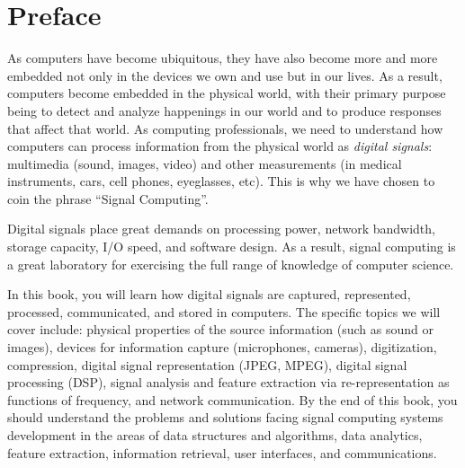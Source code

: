 
%
%
%
%
%
%

\chapter*{Preface}


As computers have become ubiquitous, they have also become more and
more embedded not only in the devices we own and use but in our
lives. As a result, computers become embedded in the physical world,
with their primary purpose being to detect and analyze happenings in
our world and to produce responses that affect that world. As
computing professionals, we need to understand how computers can
process information from the physical world as \emph{digital signals}:
multimedia (sound, images, video) and other measurements (in medical
instruments, cars, cell phones, eyeglasses, etc). This is why we have
chosen to coin the phrase ``Signal Computing''.

Digital signals place great demands on processing power, network
bandwidth, storage capacity, I/O speed, and software design. As a
result, signal computing is a great laboratory for exercising the full
range of knowledge of computer science.

In this book, you will learn how digital signals are captured,
represented, processed, communicated, and stored in computers. The
specific topics we will cover include: physical properties of the
source information (such as sound or images), devices for information
capture (microphones, cameras), digitization, compression, digital
signal representation (JPEG, MPEG), digital signal processing (DSP),
signal analysis and feature extraction via re-representation as
functions of frequency, and network communication.  By the end of this
book, you should understand the problems and solutions facing signal
computing systems development in the areas of data structures and
algorithms, data analytics, feature extraction, information retrieval,
user interfaces, and communications.

